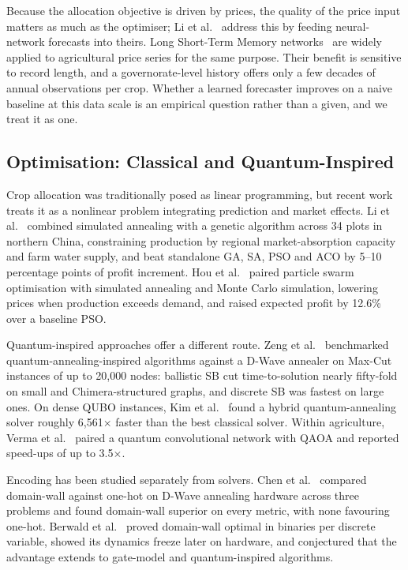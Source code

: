 \documentclass[conference,a4paper]{IEEEtran}
\begin{document}
Because the allocation objective is driven by prices, the quality of the price
input matters as much as the optimiser; Li et al.~\cite{li2025} address this by
feeding neural-network forecasts into theirs. Long Short-Term Memory
networks~\cite{hochreiter1997} are widely applied to agricultural price series
for the same purpose. Their benefit is sensitive to record length, and a
governorate-level history offers only a few decades of annual observations per
crop. Whether a learned forecaster improves on a naive baseline at this data
scale is an empirical question rather than a given, and we treat it as one.

\subsection{Optimisation: Classical and Quantum-Inspired}

Crop allocation was traditionally posed as linear programming, but recent work
treats it as a nonlinear problem integrating prediction and market effects. Li
et al.~\cite{li2025} combined simulated annealing with a genetic algorithm
across 34 plots in northern China, constraining production by regional
market-absorption capacity and farm water supply, and beat standalone GA, SA,
PSO and ACO by 5--10 percentage points of profit increment. Hou et
al.~\cite{hou2026} paired particle swarm optimisation with simulated annealing
and Monte Carlo simulation, lowering prices when production exceeds demand,
and raised expected profit by 12.6\% over a baseline PSO.

Quantum-inspired approaches offer a different route. Zeng et
al.~\cite{zeng2024} benchmarked quantum-annealing-inspired algorithms against
a D-Wave annealer on Max-Cut instances of up to 20{,}000 nodes: ballistic SB
cut time-to-solution nearly fifty-fold on small and Chimera-structured graphs,
and discrete SB was fastest on large ones. On dense QUBO instances, Kim et
al.~\cite{kim2025} found a hybrid quantum-annealing solver roughly
6{,}561$\times$ faster than the best classical solver. Within agriculture,
Verma et al.~\cite{verma2025} paired a quantum convolutional network with QAOA
and reported speed-ups of up to 3.5$\times$.

Encoding has been studied separately from solvers. Chen et
al.~\cite{chen2021} compared domain-wall against one-hot on D-Wave annealing
hardware across three problems and found domain-wall superior on every metric,
with none favouring one-hot. Berwald et al.~\cite{berwald2022} proved
domain-wall optimal in binaries per discrete variable, showed its dynamics
freeze later on hardware, and conjectured that the advantage extends to
gate-model and quantum-inspired algorithms.
\end{document}
